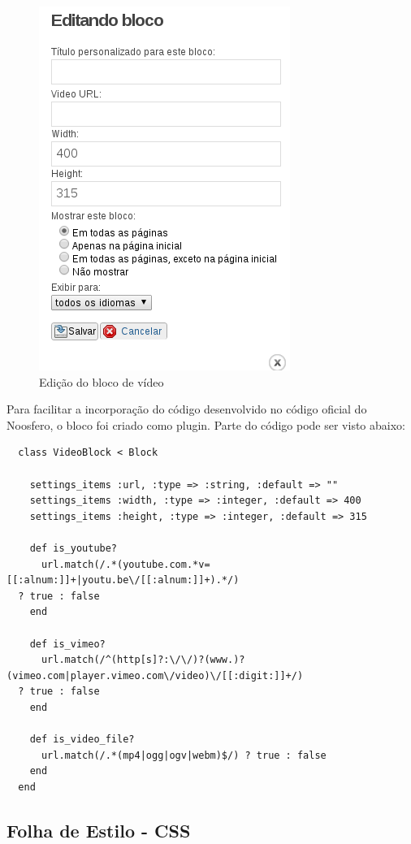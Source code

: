 \documentclass[[a4paper,11pt]{article}
\begin{document}
\begin{figure}[h]
\center
\includegraphics[scale=0.4]{bloco-video-edicao.png}
\caption{Edição do bloco de vídeo}
\label{fig:bloco-video-edicao}
\end{figure}

Para facilitar a incorporação do código desenvolvido no código oficial
do Noosfero, o bloco foi criado como plugin. Parte do código pode ser
visto abaixo:

{\scriptsize
  \begin{verbatim}
  class VideoBlock < Block
  
    settings_items :url, :type => :string, :default => ""
    settings_items :width, :type => :integer, :default => 400
    settings_items :height, :type => :integer, :default => 315
  
    def is_youtube?
      url.match(/.*(youtube.com.*v=[[:alnum:]]+|youtu.be\/[[:alnum:]]+).*/)
  ? true : false
    end
  
    def is_vimeo?
      url.match(/^(http[s]?:\/\/)?(www.)?(vimeo.com|player.vimeo.com\/video)\/[[:digit:]]+/)
  ? true : false
    end
  
    def is_video_file?
      url.match(/.*(mp4|ogg|ogv|webm)$/) ? true : false
    end
  end
  \end{verbatim}
}

\subsection{Folha de Estilo - CSS}
\end{document}
